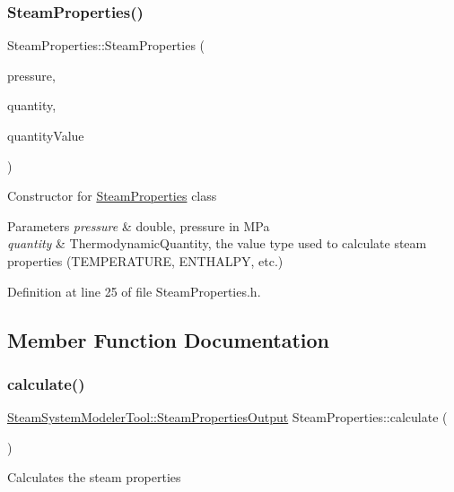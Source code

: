 \subsubsection{\texorpdfstring{Steam\+Properties()}{SteamProperties()}}
{\footnotesize\ttfamily Steam\+Properties\+::\+Steam\+Properties (\begin{DoxyParamCaption}\item[{const double}]{pressure,  }\item[{const \hyperlink{class_steam_properties_ae0294bedf7d178c2d8fb6aed0f62fbff}{Thermodynamic\+Quantity}}]{quantity,  }\item[{const double}]{quantity\+Value }\end{DoxyParamCaption})\hspace{0.3cm}{\ttfamily [inline]}}

Constructor for \hyperlink{class_steam_properties}{Steam\+Properties} class 
\begin{DoxyParams}{Parameters}
{\em pressure} & double, pressure in M\+Pa \\
\hline
{\em quantity} & Thermodynamic\+Quantity, the value type used to calculate steam properties (T\+E\+M\+P\+E\+R\+A\+T\+U\+RE, E\+N\+T\+H\+A\+L\+PY, etc.) \\
\hline
\end{DoxyParams}


Definition at line 25 of file Steam\+Properties.\+h.



\subsection{Member Function Documentation}
\mbox{\label{class_steam_properties_a8c729e006c34157435d5476fb31e30b5}} 
\subsubsection{\texorpdfstring{calculate()}{calculate()}}
{\footnotesize\ttfamily \hyperlink{struct_steam_system_modeler_tool_1_1_steam_properties_output}{Steam\+System\+Modeler\+Tool\+::\+Steam\+Properties\+Output} Steam\+Properties\+::calculate (\begin{DoxyParamCaption}{ }\end{DoxyParamCaption})}

Calculates the steam properties


